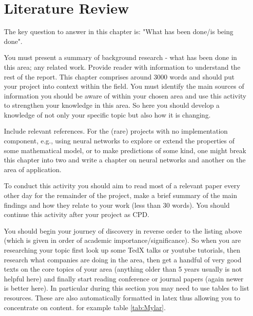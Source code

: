 \chapter{Literature Review}
\label{chap:litreview}
The key question to answer in this chapter is: "What has been done/is being done". 

You must present a summary of background research - what has been done in this area; any related work. Provide reader with information to understand the rest of the report. This chapter comprises around 3000 words and should put your project into context within the field. You must identify the main sources of information you should be aware of within your chosen area and use this activity to strengthen your knowledge in this area. So here you should develop a knowledge of not only your specific topic but also how it is changing. 

Include relevant references. For the (rare) projects with no implementation component, e.g., using neural networks to explore or extend the properties of some mathematical model, or to make predictions of some kind, one might break this chapter into two and write a chapter on neural networks and another on the area of application.

To conduct this activity you should aim to read most of a relevant paper every other day for the remainder of the project, make a brief summary of the main findings and how they relate to your work (less than 30 words). You should continue this activity after your project as CPD.

You should begin your journey of discovery in reverse order to the listing above (which is given in order of academic importance/significance). So when you are researching your topic first look up some TedX talks or youtube tutorials, then research what companies are doing in the area, then get a handful of very good texts on the core topics of your area (anything older than 5 years usually is not helpful here) and finally start reading conference or journal papers (again newer is better here). In particular during this section you may need to use tables to list resources. These are also automatically formatted in latex thus allowing you to concentrate on content. for example table \ref{tab:Mylar}.

